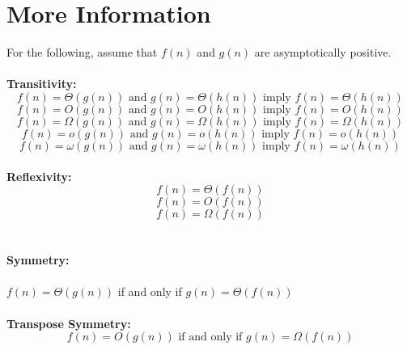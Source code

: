 \documentclass{article}
\begin{document}
\newpage

\section*{More Information}
For the following, assume that $f(n)$ and $g(n)$ are asymptotically positive.
\\ \\
\textbf{Transitivity:}\\
\begin{equation*}
f(n) = \Theta{(g(n))} \text{ and } g(n) = \Theta{(h(n))} \text{ imply } f(n) = \Theta{(h(n))}
\end{equation*}
\begin{equation*}
f(n) = O{(g(n))} \text{ and } g(n) = O{(h(n))} \text{ imply } f(n) = O{(h(n))}
\end{equation*}
\begin{equation*}
f(n) = \Omega{(g(n))} \text{ and } g(n) = \Omega{(h(n))} \text{ imply } f(n) = \Omega{(h(n))}
\end{equation*}
\begin{equation*}
f(n) = o{(g(n))} \text{ and } g(n) = o{(h(n))} \text{ imply } f(n) = o{(h(n))}
\end{equation*}
\begin{equation*}
f(n) = \omega{(g(n))} \text{ and } g(n) = \omega{(h(n))} \text{ imply } f(n) = \omega{(h(n))}
\end{equation*}
\\
\textbf{Reflexivity:}\\
\begin{equation*}
f(n) = \Theta{(f(n))}
\end{equation*}
\begin{equation*}
f(n) = O{(f(n))}
\end{equation*}
\begin{equation*}
f(n) = \Omega{(f(n))}
\end{equation*}
\\ \\
\textbf{Symmetry:}
\\ \\
$f(n) = \Theta{(g(n))}$ if and only if $g(n) = \Theta{(f(n))}$
\\ \\
\textbf{Transpose Symmetry:}\\
\begin{equation*}
f(n) = O{(g(n))} \text{ if and only if } g(n) = \Omega{(f(n))}
\end{equation*}
\end{document}

